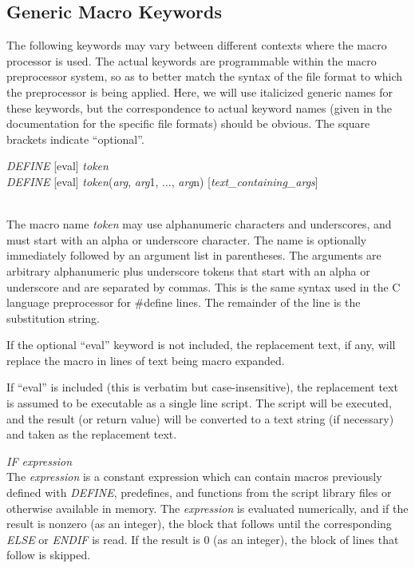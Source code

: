 \subsection{Generic Macro Keywords}

The following keywords may vary between different contexts where the
macro processor is used.  The actual keywords are programmable within
the macro preprocessor system, so as to better match the syntax of the
file format to which the preprocessor is being applied.  Here, we will
use italicized generic names for these keywords, but the
correspondence to actual keyword names (given in the documentation for
the specific file formats) should be obvious.  The square brackets
indicate ``optional''.

\begin{description}
\item\parbox[b]{4in}{\rr
{\it DEFINE} [{\vt eval}] {\it token}\\
{\it DEFINE} [{\vt eval}] {\it token}({\it arg\/},
  {\it arg\/}1, ..., {\it arg\/}n) [{\it text\_containing\_args}]\\
}\\
The macro name {\it token} may use alphanumeric characters and
underscores, and must start with an alpha or underscore character. 
The name is optionally immediately followed by an argument list in
parentheses.  The arguments are arbitrary alphanumeric plus underscore
tokens that start with an alpha or underscore and are separated by
commas.  This is the same syntax used in the C language preprocessor
for {\vt \#define} lines.  The remainder of the line is the
substitution string.

If the optional ``{\vt eval}'' keyword is not included, the
replacement text, if any, will replace the macro in lines of text
being macro expanded.

If ``{\vt eval}'' is included (this is verbatim but case-insensitive),
the replacement text is assumed to be executable as a single line
script.  The script will be executed, and the result (or return value)
will be converted to a text string (if necessary) and taken as the
replacement text.

\item{\it IF expression}\\
The {\it expression} is a constant expression which can contain macros
previously defined with {\it DEFINE}, predefines, and functions from
the script library files or otherwise available in memory.  The {\it
expression} is evaluated numerically, and if the result is nonzero (as
an integer), the block that follows until the corresponding {\it ELSE}
or {\it ENDIF} is read.  If the result is 0 (as an integer), the block
of lines that follow is skipped.


\end{description}

